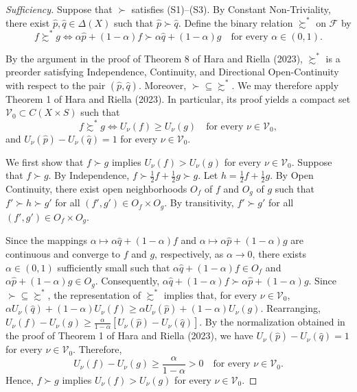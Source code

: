 \documentclass[11pt]{article}
\begin{document}
\begin{proof}[\textnormal{\textit{Sufficiency}}]
Suppose that $\succ$ satisfies (S1)--(S3). By Constant Non-Triviality,
there exist $\hat p,\hat q\in\Delta(X)$ such that
$\hat p\succ\hat q$. Define the binary relation $\succsim^*$ on
$\mathcal{F}$ by
\[
    f\succsim^* g
    \iff
    \alpha\hat p+(1-\alpha)f
    \succ
    \alpha\hat q+(1-\alpha)g
    \quad\text{for every }\alpha\in(0,1).
\]

By the argument in the proof of Theorem 8 of Hara and Riella (2023),
$\succsim^*$ is a preorder satisfying Independence, Continuity, and
Directional Open-Continuity with respect to the pair
$(\hat p,\hat q)$. Moreover, $\succ\subseteq\succsim^*$.
We may therefore apply Theorem 1 of Hara and Riella (2023). In particular,
its proof yields a compact set $\mathcal{V}_0\subset C(X\times S)$ such
that
\[
    f\succsim^* g
    \iff
    U_\nu(f)\geq U_\nu(g)
    \quad\text{for every }\nu\in\mathcal{V}_0,
\]
and $U_\nu(\hat p)-U_\nu(\hat q)=1$ for every $\nu\in\mathcal{V}_0$.

We first show that $f\succ g$ implies $U_\nu(f)>U_\nu(g)$ for every
$\nu\in\mathcal{V}_0$.
Suppose that $f\succ g$. By Independence,
$f\succ \frac12 f+\frac12 g\succ g$.
Let $h=\frac12 f+\frac12 g$. By Open Continuity, there exist open
neighborhoods $O_f$ of $f$ and $O_g$ of $g$ such that $f'\succ h\succ g'$
for all $(f',g')\in O_f\times O_g$. By transitivity, $f'\succ g'$
for all $(f',g')\in O_f\times O_g$.

Since the mappings $\alpha\mapsto\alpha\hat q+(1-\alpha)f$
and $\alpha\mapsto\alpha\hat p+(1-\alpha)g$
are continuous and converge to $f$ and $g$, respectively, as
$\alpha\to 0$, there exists $\alpha\in(0,1)$ sufficiently small
such that $\alpha\hat q+(1-\alpha)f\in O_f$ and
$\alpha\hat p+(1-\alpha)g\in O_g$. Consequently,
$\alpha\hat q+(1-\alpha)f\succ\alpha\hat p+(1-\alpha)g$.
Since $\succ\subseteq\succsim^*$, the representation of
$\succsim^*$ implies that, for every $\nu\in\mathcal{V}_0$,
$\alpha U_\nu(\hat q)+(1-\alpha)U_\nu(f)
\geq\alpha U_\nu(\hat p)+(1-\alpha)U_\nu(g)$.
Rearranging, $U_\nu(f)-U_\nu(g)
\geq\frac{\alpha}{1-\alpha}
\left[U_\nu(\hat p)-U_\nu(\hat q)\right]$.
By the normalization obtained in the proof of Theorem 1 of Hara and Riella (2023), we have
$U_\nu(\hat p)-U_\nu(\hat q)=1$ for every $\nu\in\mathcal{V}_0$.
Therefore,
\[
    U_\nu(f)-U_\nu(g)
    \geq
    \frac{\alpha}{1-\alpha}>0
    \quad\text{for every }\nu\in\mathcal{V}_0.
\]
Hence, $f\succ g$ implies $U_\nu(f)>U_\nu(g)$ for every
$\nu\in\mathcal{V}_0$.


\end{proof}
\end{document}
